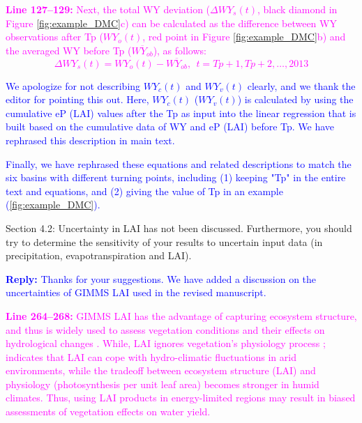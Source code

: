\documentclass[11pt]{article}
\newcounter{reviewer}
\newcounter{point}[reviewer]
\renewcommand{\thepoint}{Comment\,\thereviewer.\arabic{point}:}
\newcommand{\point}[1]{\refstepcounter{point} \bigskip \noindent {\fontseries{b}\selectfont \thepoint} #1 \par}
\newcommand{\reply}[1]{\bigskip \textcolor{blue}{\noindent \textbf {Reply:} #1}}
\newcommand{\nextreply}[1]{\bigskip \textcolor{blue}{\noindent #1}}
\newcommand{\revised}[3][2]{\bigskip \textcolor{magenta}{\noindent \textbf{Line #2:} #3}}
\begin{document}
\revised{127--129}{Next, the total WY deviation ($\Delta WY_s(t)$, black diamond in Figure \ref{fig:example_DMC}c) can be calculated as the difference between WY observations after Tp ($WY_o(t)$, red point in Figure \ref{fig:example_DMC}b) and the averaged WY before Tp ($\overline{WY_{ob}}$), as follows:
\begin{equation} 
    \Delta WY_s(t)=WY_o(t)-\overline{WY_{ob}}, \ \  t=Tp+1, Tp+2, \ldots, 2013
\end{equation}}

\nextreply{We apologize for not describing $WY_c(t)$ and $WY_v(t)$ clearly, and we thank the editor for pointing this out. Here, $WY_c(t)$ ($WY_v(t)$) is calculated by using the cumulative eP (LAI) values after the Tp as input into the linear regression that is built based on the cumulative data of WY and eP (LAI) before Tp. We have rephrased this description in main text.}

\nextreply{Finally, we have rephrased these equations and related descriptions to match the six basins with different turning points, including (1) keeping "Tp" in the entire text and equations, and (2) giving the value of Tp in an example (\ref{fig:example_DMC}).}

\point{Section 4.2: Uncertainty in LAI has not been discussed. Furthermore, you should try to determine the sensitivity of your results to uncertain input data (in precipitation, evapotranspiration and LAI).}
\reply{Thanks for your suggestions. We have added a discussion on the uncertainties of GIMMS LAI used in the revised manuscript.}

\revised{264--268}{GIMMS LAI has the advantage of capturing ecosystem structure, and thus is widely used to assess vegetation conditions and their effects on hydrological changes \citep{zhu2016greening,forzieri2020increased,gonsamo2021greening}. While, LAI ignores vegetation's physiology process \citep{fang2019overview}; \citet{hu2022decoupling} indicates that LAI can cope with hydro-climatic fluctuations in arid environments, while the tradeoff between ecosystem structure (LAI) and physiology (photosynthesis per unit leaf area) becomes stronger in humid climates. Thus, using LAI products in energy-limited regions may result in biased assessments of vegetation effects on water yield.}
\end{document}
